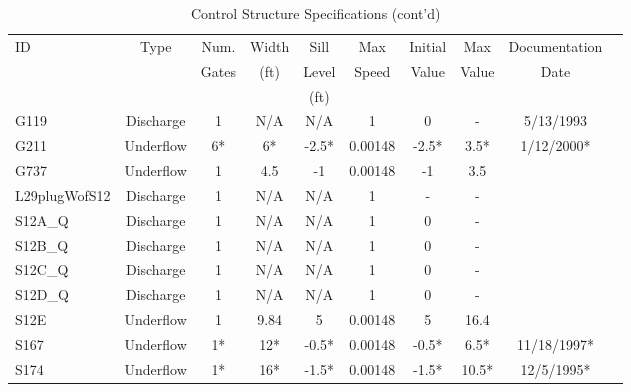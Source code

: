 \scriptsize
\begin{table}[h]
\caption{Control Structure Specifications (cont'd)}
\label{tab:struc-specs2}
\begin{tabular}{@{}lccccccccc@{}}
\toprule
{ID}            & {Type}        & Num.     & Width       & Sill         & Max         & Initial         & Max     & Documentation  \\
                &               & Gates    & (ft)        & Level        & Speed       & Value           & Value   & Date           \\
                &               &          &             & (ft)         &             &                 &         &                \\
\hline
{G119}          & Discharge     & 1        & N/A         & N/A          & 1           & 0               & -       & 5/13/1993      \\
{G211}          & Underflow     & 6*       & 6*          & -2.5*        & 0.00148     & -2.5*           & 3.5*    & 1/12/2000*      \\
{G737}         & Underflow     & 1        & 4.5         & -1           & 0.00148     & -1              & 3.5     &                 \\
{L29plugWofS12} & Discharge     & 1        & N/A         & N/A          & 1           & -               & -       &                 \\
{S12A\_Q}       & Discharge     & 1        & N/A         & N/A          & 1           & 0               & -       &                 \\
{S12B\_Q}       & Discharge     & 1        & N/A         & N/A          & 1           & 0               & -       &                 \\
{S12C\_Q}       & Discharge     & 1        & N/A         & N/A          & 1           & 0               & -       &                 \\
{S12D\_Q}       & Discharge     & 1        & N/A         & N/A          & 1           & 0               & -       &                 \\
{S12E}          & Underflow     & 1        & 9.84        & 5            & 0.00148     & 5               & 16.4    &                 \\
{S167}          & Underflow     & 1*       & 12*         & -0.5*        & 0.00148     & -0.5*           & 6.5*    & 11/18/1997*      \\
{S174}          & Underflow     & 1*       & 16*         & -1.5*        & 0.00148     & -1.5*           & 10.5*    & 12/5/1995*      \\

\end{tabular}
\end{table}
